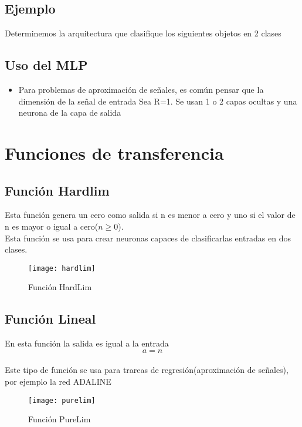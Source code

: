 \documentclass{article}
\begin{document}
\subsection{Ejemplo}
Determinemos la arquitectura que clasifique los siguientes objetos en 2 clases\\
   \newline
[3 \hspace{10px} 2]
\subsection{Uso del MLP}
\begin{itemize}
	\item Para problemas de aproximación de señales, es común pensar que la dimensión de la señal de entrada Sea R=1. Se usan 1 o 2 capas ocultas y una neurona de la capa de salida
\end{itemize}
\section{Funciones de transferencia}
\subsection{Función Hardlim}
Esta función genera un cero como salida si n es menor a cero y uno si el valor de n es mayor o igual a cero($n \ge 0$).\\
Esta función se usa para crear neuronas capaces de clasificarlas entradas en dos clases.
\begin{figure}[h!]
	\centering
	\texttt{[image: hardlim]}
	\caption{Función HardLim}
\end{figure}
\newpage
\subsection{Función Lineal}
En esta función la salida es igual a la entrada
$$a = n$$\\
Este tipo de función se usa para trareas de regresión(aproximación de señales), por ejemplo la red ADALINE
\begin{figure}[h!]
	\centering
	\texttt{[image: purelim]}
	\caption{Función PureLim}
\end{figure}
\end{document}
